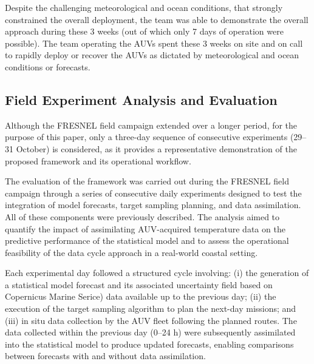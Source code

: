 Despite the challenging meteorological and ocean conditions, that
strongly constrained the overall deployment, the \proj team was able to
demonstrate the overall approach during these 3 weeks (out of which only
7 days of operation were possible). The team operating the AUVs spent
these 3 weeks on site and on call to rapidly deploy or recover the AUVs
as dictated by meteorological and ocean conditions or forecasts.



\subsection{Field Experiment Analysis and Evaluation}

Although the FRESNEL field campaign extended over a longer period, for
the purpose of this paper, only a three-day sequence of consecutive
experiments (29–31 October) is considered, as it provides a
representative demonstration of the proposed framework and its
operational workflow.

The evaluation of the framework was carried out during the FRESNEL
field campaign through a series of consecutive daily experiments
designed to test the integration of model forecasts, target sampling
planning, and data assimilation. All of these components were
previously described. The analysis aimed to quantify the impact of
assimilating AUV-acquired temperature data on the predictive
performance of the statistical model and to assess the operational
feasibility of the data cycle approach in a real-world coastal
setting.

Each experimental day followed a structured cycle involving: (i) the
generation of a statistical model forecast and its associated
uncertainty field based on Copernicus Marine Serice) data available up to the previous
day; (ii) the execution of the target sampling algorithm to plan the
next-day missions; and (iii) in situ data collection by the AUV fleet
following the planned routes. The data collected within the previous
day (0–24 h) were subsequently assimilated into the statistical model
to produce updated forecasts, enabling comparisons between forecasts
with and without data assimilation.

